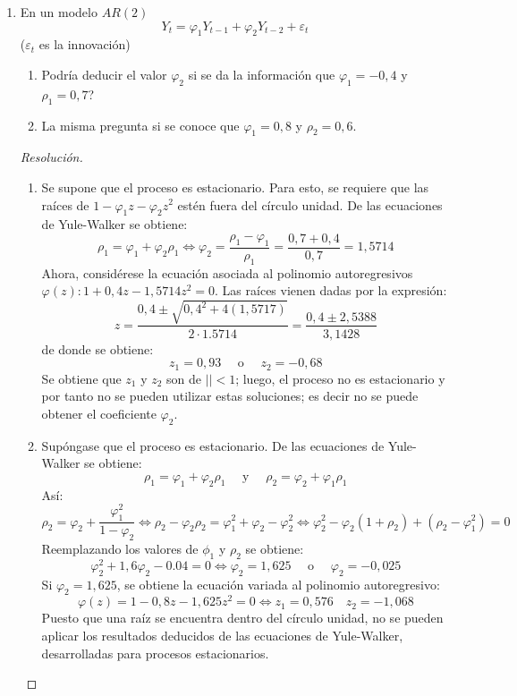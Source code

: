 \begin{ejemplo}
\quad 
\begin{enumerate}
\item En un modelo $AR(2)$
\[
 Y_{t} =\varphi_{1} Y_{t-1} +\varphi_{2} Y_{t-2} +\varepsilon_{t} 
\]
($\varepsilon_{t}$ es la innovaci\'{o}n)

\begin{enumerate}
\item Podr\'{i}a deducir el valor $\varphi_{2} $ si se da la informaci\'{o}n que $\varphi_{1} =-0,4$ y $\rho_{1} =0,7$?
\item La misma pregunta si se conoce que $\varphi_{1} =0,8$ y $\rho_{2} =0,6$.
\end{enumerate}

\begin{proof}[Resoluci\'{o}n]
\quad
\begin{enumerate}
\item Se supone que el proceso es estacionario. Para esto, se requiere que las ra\'{i}ces de $1 - \varphi_{{1}}z - \varphi_{{2}}z^{2 }$ est\'{e}n fuera del c\'{i}rculo unidad. De las ecuaciones de Yule-Walker se obtiene: 
\[
\rho_{1}=
\varphi_{1} +\varphi_{2} \rho_{1} 
\Longleftrightarrow 
\varphi_{2} =\frac{\rho_{1} -\varphi_{1} }{\rho_{1} 
}=\frac{0,7+0,4}{0,7}=1,5714
\]
Ahora, consid\'{e}rese la ecuaci\'{o}n asociada al polinomio autoregresivos $\varphi (z): 1+0,4z-1,5714z^{2}=0$. Las ra\'{i}ces vienen dadas por la expresi\'{o}n:
\[
z=\frac{0,4\pm \sqrt {0,4^{2}+4(1,5717)} }{2\cdot 1.5714}=\frac{0,4\pm 2,5388}{3,1428}
\]
de donde se obtiene: 
\[
z_{1 }= 0,93\quad\text{ o }\quad z_{2 }= -0,68
\]
Se obtiene que $z_{1}$ y $z_{2}$ son de $\left| \right|<1$; luego, el proceso no es estacionario y por tanto no se pueden utilizar estas soluciones; es decir no se puede obtener el coeficiente $\varphi_{2} $.

\item Sup\'{o}ngase que el proceso es estacionario. De las ecuaciones de Yule-Walker se obtiene: 
\[
\rho_{{1}}=\varphi_{1} +\varphi_{2}\rho_{1}\quad\text{ y }\quad \rho_{2} =\varphi_{2} +\varphi_{1} \rho_{1} 
\]
As\'{i}:
\[
\rho_{2} = \varphi_{2} +\frac{\varphi_{1}^{2} }{1-\varphi_{2} }\Leftrightarrow \rho_{2} -\varphi_{2} \rho_{2} =\varphi_{1}^{2} +\varphi_{2} -\varphi_{2}^{2} \Leftrightarrow \varphi_{2}^{2} -\varphi_{2} (1+\rho_{2} 
)+(\rho_{2} -\varphi_{1}^{2} )=0
\]
Reemplazando los valores de $\phi_{1}$ y $\rho_{2} $ se obtiene:
\[
\varphi_{2}^{2} +1,6\varphi_{2} -0.04=0\Longleftrightarrow \varphi_{2} 
=1,625\quad\text{ o }\quad \varphi_{2} =-0,025
\]
Si $\varphi_{{2}}=1,625$, se obtiene la ecuaci\'{o}n variada al polinomio autoregresivo:
\[
\varphi (z)=1-0,8z-1,625z^{2}=0\Longleftrightarrow z_{1} =0,576\quad z_{2} =-1,068
\]
Puesto que una ra\'{i}z se encuentra dentro del c\'{i}rculo unidad, no se pueden aplicar los resultados deducidos de las ecuaciones de Yule-Walker, desarrolladas para procesos estacionarios.\newline


\end{enumerate}
\end{proof}
\end{enumerate}
\end{ejemplo}
